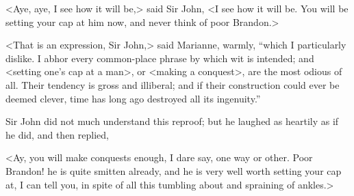 <Aye, aye, I see how it will be,> said Sir John, <I see how it will be. You will be setting your cap at him now, and never think of poor Brandon.>

<That is an expression, Sir John,> said Marianne, warmly, “which I particularly dislike. I abhor every common-place phrase by which wit is intended; and <setting one's cap at a man>, or <making a conquest>, are the most odious of all. Their tendency is gross and illiberal; and if their construction could ever be deemed clever, time has long ago destroyed all its ingenuity.”

Sir John did not much understand this reproof; but he laughed as heartily as if he did, and then replied,

<Ay, you will make conquests enough, I dare say, one way or other. Poor Brandon! he is quite smitten already, and he is very well worth setting your cap at, I can tell you, in spite of all this tumbling about and spraining of ankles.>